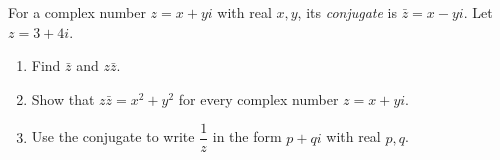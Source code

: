 For a complex number $z=x+yi$ with real $x,y$, its \emph{conjugate} is $\bar z=x-yi$. Let $z=3+4i$.
\begin{enumerate}
\item[(a)] Find $\bar z$ and $z\bar z$.
\item[(b)] Show that $z\bar z=x^2+y^2$ for every complex number $z=x+yi$.
\item[(c)] Use the conjugate to write $\dfrac{1}{z}$ in the form $p+qi$ with real $p,q$.
\end{enumerate}
